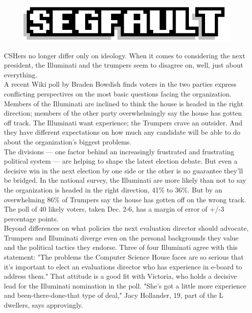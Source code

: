 \documentclass[9pt]{extarticle} %
\begin{document}
\begin{figure}[H]
\centering\vspace{0.5cm}\includegraphics[width=0.8\linewidth]{segfault.png}
\end{figure}

\hypertarget{Thirdnews}{}

CSHers no longer differ only on ideology. When it comes to considering the next president, the Illuminati and the trumpers seem to disagree on, well, just about everything. \\

A recent Wiki poll by Braden Bowdish finds voters in the two parties express conflicting perspectives on the most basic questions facing the organization. Members of the Illuminati are inclined to think the house is headed in the right direction; members of the other party overwhelmingly say the house has gotten off track. The Illuminati want experience; the Trumpers crave an outsider. And they have different expectations on how much any candidate will be able to do about the organization's biggest problems. \\

The divisions — one factor behind an increasingly frustrated and frustrating political system — are helping to shape the latest election debate. But even a decisive win in the next election by one side or the other is no guarantee they'll be bridged. In the national survey, the Illuminati are more likely than not to say the organization is headed in the right direction, 41\% to 36\%. But by an overwhelming 86\% of Trumpers say the house has gotten off on the wrong track. The poll of 40 likely voters, taken Dec. 2-6, has a margin of error of +/-3 percentage points. \\

Beyond differences on what policies the next evaluation director should advocate, Trumpers and Illuminati diverge even on the personal backgrounds they value and the political tactics they endorse. Three of four Illuminati agree with this statement: "The problems the Computer Science House faces are so serious that it's important to elect an evaluations director who has experience in e-board to address them." That attitude is a good fit with Victoria, who holds a decisive lead for the Illuminati nomination in the poll. "She's got a little more experience and been-there-done-that type of deal," Jacy Hollander, 19, part of the L dwellers, says approvingly. \\
\end{document}

